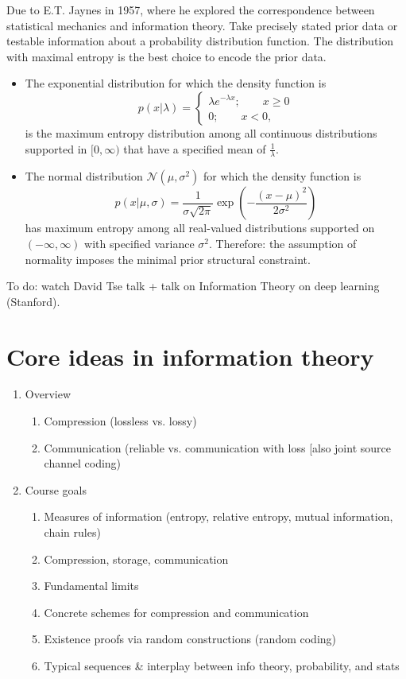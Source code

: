 \documentclass[12pt]{extarticle}
\begin{document}
  Due to E.T. Jaynes in 1957, where he explored the correspondence between statistical mechanics and information theory.  Take precisely stated prior data or testable information about a probability distribution function.  The distribution with maximal entropy is the best choice to encode the prior data.

  \begin{itemize}
    \item The exponential distribution for which the density function is
      \[
        p(x | \lambda) = 
        \begin{cases}
          \lambda e^{- \lambda x}; \qquad x \geq 0 \\
          0; \qquad x < 0,
        \end{cases}
      \]
      is the maximum entropy distribution among all continuous distributions supported in $[0, \infty)$ that have a specified mean of $\frac{1}{\lambda}$.
    \item The normal distribution $\mathcal{N}(\mu, \sigma^2)$ for which the density function is
      \[
        p(x | \mu, \sigma) = \frac{1}{\sigma \sqrt{2 \pi}} \exp \left( - \frac{(x-\mu)^2}{2 \sigma^2} \right)
      \]
      has maximum entropy among all real-valued distributions supported on $(-\infty, \infty)$ with specified variance $\sigma^2$.  Therefore: the assumption of normality imposes the minimal prior structural constraint. 

    \end{itemize}


    To do: watch David Tse talk + talk on Information Theory on deep learning (Stanford).


\section{Core ideas in information theory}
\begin{enumerate}
  \item Overview
    \begin{enumerate}
      \item Compression (lossless vs. lossy)
      \item Communication (reliable vs. communication with loss [also joint source channel coding)
    \end{enumerate}
  \item Course goals
    \begin{enumerate}
      \item Measures of information (entropy, relative entropy, mutual information, chain rules)
      \item Compression, storage, communication
      \item Fundamental limits
      \item Concrete schemes for compression and communication
      \item Existence proofs via random constructions (random coding)
      \item Typical sequences & interplay between info theory, probability, and stats
    \end{enumerate}

\end{enumerate}
\end{document}
